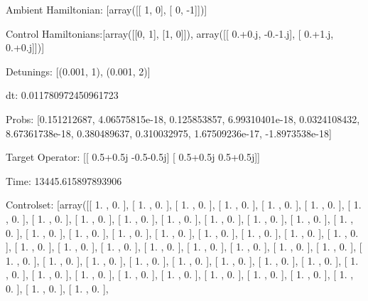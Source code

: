 \documentclass{article}
\begin{document}
    

\newpage

Ambient Hamiltonian: [array([[ 1,  0],
       [ 0, -1]])]

Control Hamiltonians:[array([[0, 1],
       [1, 0]]), array([[ 0.+0.j, -0.-1.j],
       [ 0.+1.j,  0.+0.j]])]

Detunings: [(0.001, 1), (0.001, 2)]

 dt: 0.011780972450961723

Probs: [0.151212687, 4.06575815e-18, 0.125853857, 6.99310401e-18, 0.0324108432, 8.67361738e-18, 0.380489637, 0.310032975, 1.67509236e-17, -1.8973538e-18]

Target Operator: [[ 0.5+0.5j -0.5-0.5j]
 [ 0.5+0.5j  0.5+0.5j]]

Time: 13445.615897893906

Controlset: [array([[ 1.        ,  0.        ],
       [ 1.        ,  0.        ],
       [ 1.        ,  0.        ],
       [ 1.        ,  0.        ],
       [ 1.        ,  0.        ],
       [ 1.        ,  0.        ],
       [ 1.        ,  0.        ],
       [ 1.        ,  0.        ],
       [ 1.        ,  0.        ],
       [ 1.        ,  0.        ],
       [ 1.        ,  0.        ],
       [ 1.        ,  0.        ],
       [ 1.        ,  0.        ],
       [ 1.        ,  0.        ],
       [ 1.        ,  0.        ],
       [ 1.        ,  0.        ],
       [ 1.        ,  0.        ],
       [ 1.        ,  0.        ],
       [ 1.        ,  0.        ],
       [ 1.        ,  0.        ],
       [ 1.        ,  0.        ],
       [ 1.        ,  0.        ],
       [ 1.        ,  0.        ],
       [ 1.        ,  0.        ],
       [ 1.        ,  0.        ],
       [ 1.        ,  0.        ],
       [ 1.        ,  0.        ],
       [ 1.        ,  0.        ],
       [ 1.        ,  0.        ],
       [ 1.        ,  0.        ],
       [ 1.        ,  0.        ],
       [ 1.        ,  0.        ],
       [ 1.        ,  0.        ],
       [ 1.        ,  0.        ],
       [ 1.        ,  0.        ],
       [ 1.        ,  0.        ],
       [ 1.        ,  0.        ],
       [ 1.        ,  0.        ],
       [ 1.        ,  0.        ],
       [ 1.        ,  0.        ],
       [ 1.        ,  0.        ],
       [ 1.        ,  0.        ],
       [ 1.        ,  0.        ],
       [ 1.        ,  0.        ],
       [ 1.        ,  0.        ],
       [ 1.        ,  0.        ],
       [ 1.        ,  0.        ],
       [ 1.        ,  0.        ],
       [ 1.        ,  0.        ],
       [ 1.        ,  0.        ],
\end{document}
